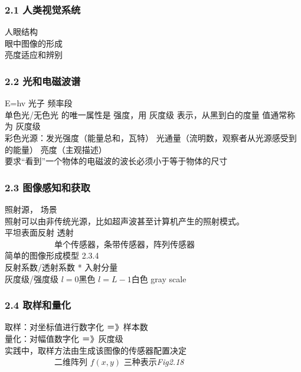\documentclass[]{article}
\begin{document}
\subsubsection{2.1 人类视觉系统}\label{header-n40}

 人眼结构\\
 眼中图像的形成\\
 亮度适应和辨别\\

\subsubsection{2.2 光和电磁波谱}\label{header-n46}

 E=hv 光子 频率段\\
 单色光/无色光 的唯一属性是 强度，用 灰度级 表示，从黑到白的度量
值通常称为 灰度级\\
 彩色光源：发光强度（能量总和，瓦特）
光通量（流明数，观察者从光源感受到的能量） 亮度（主观描述）\\
 要求``看到''一个物体的电磁波的波长必须小于等于物体的尺寸\\

\subsubsection{2.3 图像感知和获取}\label{header-n53}

 照射源， 场景\\
 照射可以由非传统光源，比如超声波甚至计算机产生的照射模式。\\
 平坦表面反射 透射\\
 \(\qquad\)\(\qquad\)\(\qquad\)单个传感器，条带传感器，阵列传感器\\
 简单的图像形成模型 2.3.4\\
 反射系数/透射系数 * 入射分量\\
 灰度级/强度级 \(l=0\)黑色 \(l=L-1\)白色 gray scale\\

\subsubsection{2.4 取样和量化}\label{header-n63}

 取样：对坐标值进行数字化 ＝》样本数\\
 量化：对幅值数字化 ＝》灰度级\\
 实践中，取样方法由生成该图像的传感器配置决定\\
 \(\qquad\)\(\qquad\)\(\qquad\)二维阵列 \(f(x,y)\)
三种表示\emph{Fig2.18}\\
\end{document}
